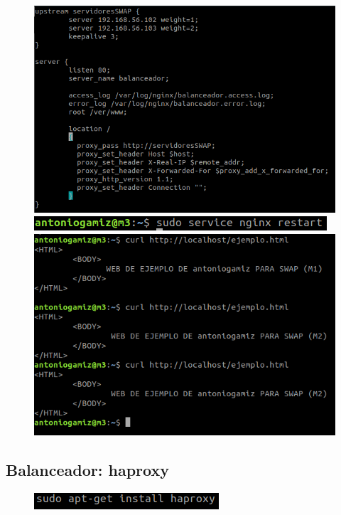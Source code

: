 \documentclass[12pt]{article}
\begin{document}
\begin{figure}[H]
\center
\includegraphics[scale=0.5]{22.png}
\includegraphics[scale=0.6]{23.png}
\includegraphics[scale=0.5]{24.png}
\end{figure}




\subsection{Balanceador: haproxy}

\begin{figure}[H]
\center
\includegraphics[scale=0.5]{12.png}
\end{figure}
\end{document}
